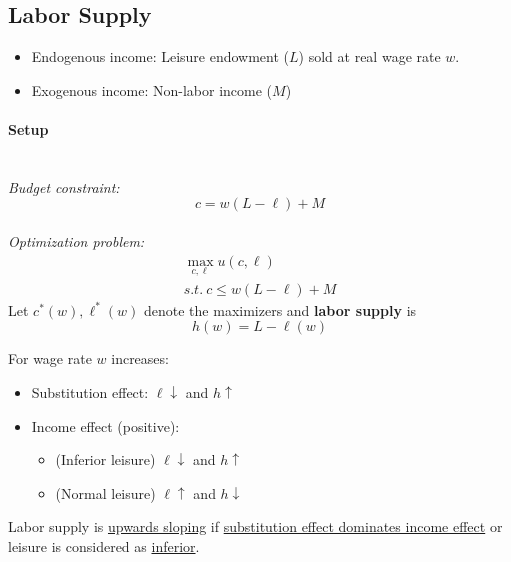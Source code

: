\documentclass[]{article}
\begin{document}
        \subsection{Labor Supply}
            \begin{itemize}
                \item Endogenous income: Leisure endowment ($L$) sold at real wage rate $w$.
                \item Exogenous income: Non-labor income ($M$) 
            \end{itemize}
            \paragraph{Setup}
            \quad \\
            \emph{Budget constraint:}
            \[
                c = w(L-\ell) + M
            \]
            \\
            \emph{Optimization problem:}
            \begin{gather*}
                \max_{c, \ell} u(c,\ell)\\ s.t.\ c \leq w(L - \ell) + M
            \end{gather*}
            Let $c^*(w), \ell^*(w)$ denote the maximizers and \textbf{labor supply} is
            \[
                h(w) = L - \ell(w)
            \]
            \begin{example}
                For wage rate $w$ increases:
                \begin{itemize}
                    \item Substitution effect: $\ell \downarrow$ and $h \uparrow$
                    \item Income effect (positive):
                        \begin{itemize}
                            \item (Inferior leisure) $\ell \downarrow$ and $h \uparrow$
                            \item (Normal leisure) $\ell \uparrow$ and $h \downarrow$
                        \end{itemize}
                \end{itemize}
            \end{example}
            
            \begin{remark}
                Labor supply is \ul{upwards sloping} if \ul{substitution effect dominates income effect} or leisure is considered as \ul{inferior}.
            \end{remark}
        
\end{document}
